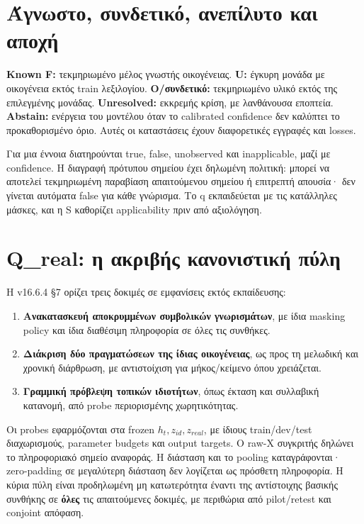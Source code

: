 \documentclass[
  10pt,
  a4paper,
]{report}
\providecommand{\tightlist}{%
  \setlength{\itemsep}{0pt}\setlength{\parskip}{0pt}}
\begin{document}
\section{Άγνωστο, συνδετικό, ανεπίλυτο και
αποχή}\label{ux3acux3b3ux3bdux3c9ux3c3ux3c4ux3bf-ux3c3ux3c5ux3bdux3b4ux3b5ux3c4ux3b9ux3baux3cc-ux3b1ux3bdux3b5ux3c0ux3afux3bbux3c5ux3c4ux3bf-ux3baux3b1ux3b9-ux3b1ux3c0ux3bfux3c7ux3ae}

\textbf{Known F:} τεκμηριωμένο μέλος γνωστής οικογένειας. \textbf{U:}
έγκυρη μονάδα με οικογένεια εκτός train λεξιλογίου.
\textbf{O/συνδετικό:} τεκμηριωμένο υλικό εκτός της επιλεγμένης μονάδας.
\textbf{Unresolved:} εκκρεμής κρίση, με λανθάνουσα εποπτεία.
\textbf{Abstain:} ενέργεια του μοντέλου όταν το calibrated confidence
δεν καλύπτει το προκαθορισμένο όριο. Αυτές οι καταστάσεις έχουν
διαφορετικές εγγραφές και losses.

Για μια έννοια διατηρούνται true, false, unobserved και inapplicable,
μαζί με confidence. Η διαγραφή πρότυπου σημείου έχει δηλωμένη πολιτική:
μπορεί να αποτελεί τεκμηριωμένη παραβίαση απαιτούμενου σημείου ή
επιτρεπτή απουσία· δεν γίνεται αυτόματα false για κάθε γνώρισμα. Το q
εκπαιδεύεται με τις κατάλληλες μάσκες, και η S καθορίζει applicability
πριν από αξιολόγηση.

\section{Q\_real: η ακριβής κανονιστική
πύλη}\label{q_real-ux3b7-ux3b1ux3baux3c1ux3b9ux3b2ux3aeux3c2-ux3baux3b1ux3bdux3bfux3bdux3b9ux3c3ux3c4ux3b9ux3baux3ae-ux3c0ux3cdux3bbux3b7}

Η v16.6.4 §7 ορίζει τρεις δοκιμές σε εμφανίσεις εκτός εκπαίδευσης:

\begin{enumerate}
\def\labelenumi{\arabic{enumi}.}
\tightlist
\item
  \textbf{Ανακατασκευή αποκρυμμένων συμβολικών γνωρισμάτων}, με ίδια
  masking policy και ίδια διαθέσιμη πληροφορία σε όλες τις συνθήκες.
\item
  \textbf{Διάκριση δύο πραγματώσεων της ίδιας οικογένειας}, ως προς τη
  μελωδική και χρονική διάρθρωση, με αντιστοίχιση για μήκος/κείμενο όπου
  χρειάζεται.
\item
  \textbf{Γραμμική πρόβλεψη τοπικών ιδιοτήτων}, όπως έκταση και
  συλλαβική κατανομή, από probe περιορισμένης χωρητικότητας.
\end{enumerate}

Οι probes εφαρμόζονται στα frozen \(h_t,z_{id},z_{real}\), με ίδιους
train/dev/test διαχωρισμούς, parameter budgets και output targets. Ο
raw-X συγκριτής δηλώνει το πληροφοριακό σημείο αναφοράς. Η διάσταση και
το pooling καταγράφονται· zero-padding σε μεγαλύτερη διάσταση δεν
λογίζεται ως πρόσθετη πληροφορία. Η κύρια πύλη είναι προδηλωμένη μη
κατωτερότητα έναντι της αντίστοιχης βασικής συνθήκης σε \textbf{όλες}
τις απαιτούμενες δοκιμές, με περιθώρια από pilot/retest και conjoint
απόφαση.
\end{document}
